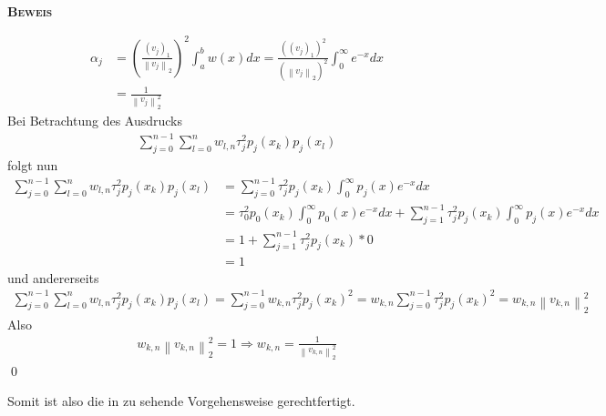 \documentclass[12pt,a4paper]{scrartcl}
\numberwithin{equation}{section}
\numberwithin{myalgctr}{section}
\numberwithin{mytheoremctr}{subsection}
\numberwithin{mykorollarctr}{subsection}
\numberwithin{mylemmactr}{subsection}
\numberwithin{mybeispielctr}{subsection}
\newenvironment{myproof}{%
	\bigskip\noindent%
	\textsc{\textbf{\\Beweis\\}}%
	\indent
}{\qed\par\bigskip}  %
\newcommand\norm[1]{\left\lVert#1\right\rVert}
\begin{document}
\begin{myproof}
		\begin{align*}
			\alpha_j &= \left(\frac{(v_j)_1}{\norm{v_j}_2}\right)^2 \int_{a}^{b} w(x)dx = \frac{((v_j)_1)^2}{(\norm{v_j}_2)^2} \int_{0}^{\infty} e^{-x}dx \\
			& = \frac{1}{\norm{v_j}_2^2}
		\end{align*}
		Bei Betrachtung des Ausdrucks 
		\begin{align*}
			\sum_{j=0}^{n-1} \sum_{l=0}^{n} w_{l,n} \tau_j^2 p_j(x_k)p_j(x_l)
		\end{align*}
		folgt nun
		\begin{align*}
			\sum_{j=0}^{n-1} \sum_{l=0}^{n} w_{l,n} \tau_j^2 p_j(x_k)p_j(x_l) &= \sum_{j=0}^{n-1} \tau_j^2 p_j(x_k) \int_{0}^{\infty} p_j(x)e^{-x}dx \\
			& = \tau_0^2 p_0(x_k) \int_{0}^{\infty} p_0(x)e^{-x}dx + \sum_{j=1}^{n-1} \tau_j^2 p_j(x_k) \int_{0}^{\infty} p_j(x)e^{-x}dx \\
			& = 1 + \sum_{j=1}^{n-1} \tau_j^2 p_j(x_k) * 0 \\
			& = 1
		\end{align*}
		und andererseits
		\begin{align*}
			\sum_{j=0}^{n-1} \sum_{l=0}^{n} w_{l,n} \tau_j^2 p_j(x_k)p_j(x_l) 
			 = \sum_{j=0}^{n-1} w_{k,n} \tau_j^2 p_j(x_k)^2 
			 = w_{k,n} \sum_{j=0}^{n-1}  \tau_j^2 p_j(x_k)^2
			 = w_{k,n}\norm{v_{k,n}}_2^2	
		\end{align*}
		Also
		\begin{align*}
			w_{k,n}\norm{v_{k,n}}_2^2 = 1 \Rightarrow  w_{k,n} = \frac{1}{\norm{v_{k,n}}_2^2}
		\end{align*}
	\end{myproof}
	\newpage
	Somit ist also die in  zu sehende Vorgehensweise gerechtfertigt.
	
	
	
\end{document}

